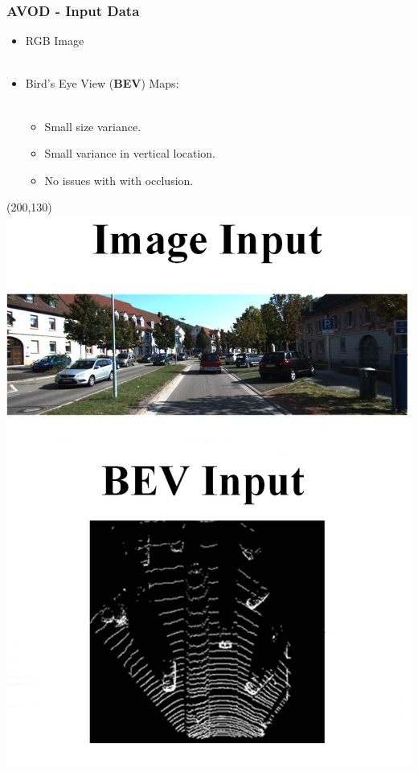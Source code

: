\documentclass[10pt,fleqn,unknownkeysallowed]{beamer}
\begin{document}
\begin{frame}
	\frametitle{AVOD - Input Data}
	\begin{itemize}
		\item{RGB Image}
		\\~\\
		\item{Bird's Eye View (\textbf{BEV}) Maps:}
		\\~\\
		\begin{itemize}
			\item{Small size variance.}
			\item{Small variance in vertical location.}
			\item{No issues with with occlusion.}
		\end{itemize}
	\end{itemize}
	\begin{picture}(200,130)
	\hspace{6.2cm}
		\includegraphics[width=0.5\linewidth]{images/Meta-Architecture_input}
	\end{picture}
\end{frame}
\end{document}
